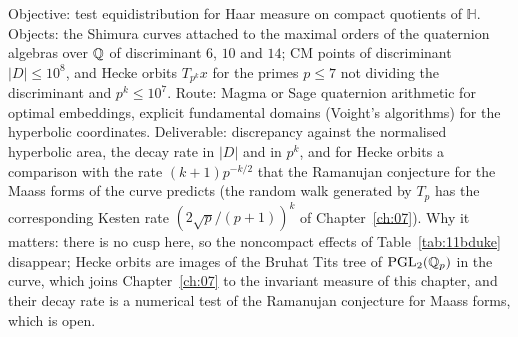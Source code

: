 \begin{compproblem}\label{cp:11bshimura}
Objective: test equidistribution for Haar measure on compact quotients of $\mathbb H$. Objects: the Shimura curves attached to the maximal orders of the quaternion algebras over $\mathbb{Q}$ of discriminant $6$, $10$ and $14$; CM points of discriminant $|D|\le10^8$, and Hecke orbits $T_{p^k}x$ for the primes $p\le7$ not dividing the discriminant and $p^k\le10^7$. Route: Magma or Sage quaternion arithmetic for optimal embeddings, explicit fundamental domains (Voight's algorithms) for the hyperbolic coordinates. Deliverable: discrepancy against the normalised hyperbolic area, the decay rate in $|D|$ and in $p^k$, and for Hecke orbits a comparison with the rate $(k+1)p^{-k/2}$ that the Ramanujan conjecture for the Maass forms of the curve predicts (the random walk generated by $T_p$ has the corresponding Kesten rate $(2\sqrt p/(p+1))^k$ of Chapter~\ref{ch:07}). Why it matters: there is no cusp here, so the noncompact effects of Table~\ref{tab:11bduke} disappear; Hecke orbits are images of the Bruhat Tits tree of $\mathrm{PGL}_2(\mathbb{Q}_p)$ in the curve, which joins Chapter~\ref{ch:07} to the invariant measure of this chapter, and their decay rate is a numerical test of the Ramanujan conjecture for Maass forms, which is open.
\end{compproblem}
